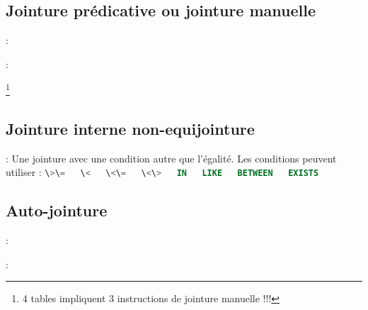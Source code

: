 \documentclass[10pt]{beamer}
\begin{document}
\subsection{Jointure prédicative ou jointure manuelle}

\begin{frame}{\secname : \subsecname}
    
\end{frame}

\begin{frame}{\secname : \subsecname}
    
    \footnote{4 tables impliquent 3 instructions de jointure manuelle !!!}
\end{frame}

\subsection{Jointure interne non-equijointure}
\begin{frame}{\secname : \subsecname}
    Une jointure avec une condition autre que l'égalité.
    Les conditions peuvent utiliser :
    \lstinline[language=sql]!\>\=   \<   \<\=   \<\>   IN   LIKE   BETWEEN   EXISTS!
    
\end{frame}

\subsection{Auto-jointure}
\begin{frame}{\secname : \subsecname}
    
\end{frame}


\begin{frame}{\secname : \subsecname}
    
\end{frame}
\end{document}
